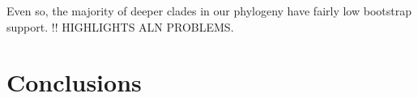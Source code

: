 \documentclass[fleqn,10pt]{wlpeerj}
\begin{document}
Even so, the majority of deeper clades in our phylogeny have fairly low bootstrap support. !! HIGHLIGHTS ALN PROBLEMS.

\section*{Conclusions}
\end{document}
